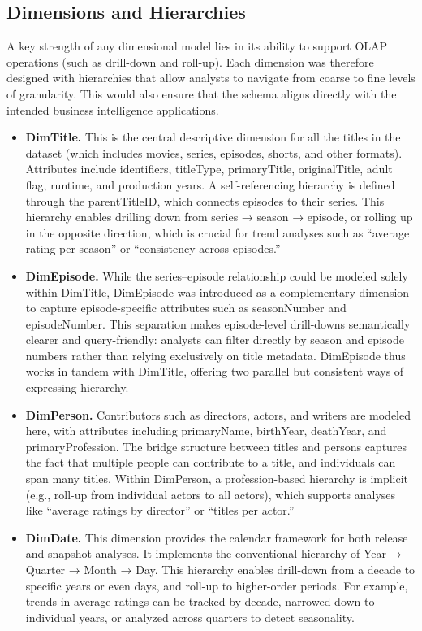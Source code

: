 \subsection{Dimensions and Hierarchies}

A key strength of any dimensional model lies in its ability to support OLAP operations (such as drill-down and roll-up). Each dimension was therefore designed with hierarchies that allow analysts to navigate from coarse to fine levels of granularity. This would also ensure that the schema aligns directly with the intended business intelligence applications.

\begin{itemize}
    \item \textbf{DimTitle.} This is the central descriptive dimension for all the titles in the dataset (which includes movies, series, episodes, shorts, and other formats). Attributes include identifiers, titleType, primaryTitle, originalTitle, adult flag, runtime, and production years. A self-referencing hierarchy is defined through the parentTitleID, which connects episodes to their series. This hierarchy enables drilling down from series → season → episode, or rolling up in the opposite direction, which is crucial for trend analyses such as “average rating per season” or “consistency across episodes.”
    \item \textbf{DimEpisode.} While the series–episode relationship could be modeled solely within DimTitle, DimEpisode was introduced as a complementary dimension to capture episode-specific attributes such as seasonNumber and episodeNumber. This separation makes episode-level drill-downs semantically clearer and query-friendly: analysts can filter directly by season and episode numbers rather than relying exclusively on title metadata. DimEpisode thus works in tandem with DimTitle, offering two parallel but consistent ways of expressing hierarchy.
    \item \textbf{DimPerson.} Contributors such as directors, actors, and writers are modeled here, with attributes including primaryName, birthYear, deathYear, and primaryProfession. The bridge structure between titles and persons captures the fact that multiple people can contribute to a title, and individuals can span many titles. Within DimPerson, a profession-based hierarchy is implicit (e.g., roll-up from individual actors to all actors), which supports analyses like “average ratings by director” or “titles per actor.”
    \item \textbf{DimDate.} This dimension provides the calendar framework for both release and snapshot analyses. It implements the conventional hierarchy of Year → Quarter → Month → Day. This hierarchy enables drill-down from a decade to specific years or even days, and roll-up to higher-order periods. For example, trends in average ratings can be tracked by decade, narrowed down to individual years, or analyzed across quarters to detect seasonality.
\end{itemize}

